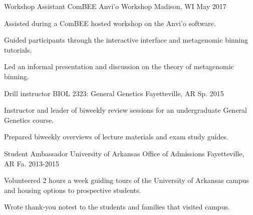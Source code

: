 \begin{cventries}
  \cventry
    {Workshop Assistant} %
    {ComBEE Anvi'o Workshop} %
    {Madison, WI} %
    {May 2017} %
    {
      \begin{cvitems} %
        \item {Assisted during a ComBEE hosted workshop on the Anvi'o software.}
        \item {Guided participants through the interactive interface and metagenomic binning tutorials.}
        \item {Led an informal presentation and discussion on the theory of metagenomic binning.}
      \end{cvitems}
    }

  \cventry
    {Drill instructor} %
    {BIOL 2323: General Genetics} %
    {Fayetteville, AR} %
    {Sp. 2015} %
    {
      \begin{cvitems} %
        \item {Instructor and leader of biweekly review sessions for an undergraduate General Genetics course.}
        \item {Prepared biweekly overviews of lecture materials and exam study guides.}
      \end{cvitems}
    }

  \cventry
    {Student Ambassador} %
    {University of Arkansas Office of Admissions} %
    {Fayetteville, AR} %
    {Fa. 2013-2015} %
    {
      \begin{cvitems} %
        \item {Volunteered 2 hours a week guiding tours of the University of Arkansas campus and housing options to prospective students.}
        \item {Wrote thank-you notest to the students and families that visited campus.}
      \end{cvitems}
    }

\end{cventries}
